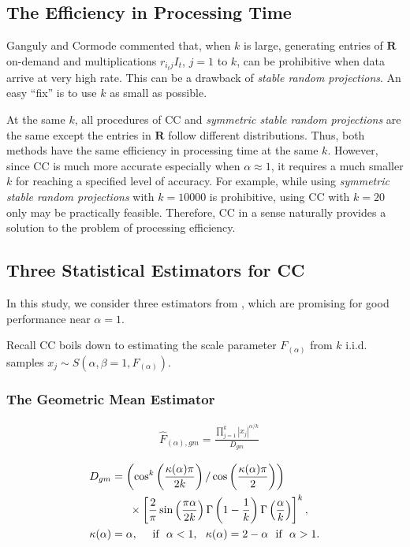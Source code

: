 \documentclass{sig-alternate}
\begin{document}
\subsection{The Efficiency in Processing Time}

Ganguly and Cormode \cite{Proc:Ganguly_RANDOM07} commented that, when $k$ is large, generating entries of $\mathbf{R}$ on-demand and multiplications $r_{i_tj} I_t$, $j = 1$ to $k$, can be prohibitive when  data arrive at very high rate.  This can be a drawback of {\em stable random projections}. An easy ``fix'' is to use $k$ as small as possible.

At the same $k$, all procedures of CC and {\em symmetric stable random projections} are the same except the entries in $\mathbf{R}$ follow different distributions. Thus, both methods have the same efficiency in processing time at the same $k$. However, since CC is much more accurate especially when $\alpha\approx 1$, it requires a much smaller  $k$ for reaching a specified level of accuracy. For example, while using {\em symmetric stable random projections} with $k = 10000$ is prohibitive, using CC with $k = 20$ only may be practically feasible.  Therefore, CC in a sense naturally provides a solution to the problem of processing efficiency. 

\subsection{Three Statistical Estimators for CC}

In this study, we consider three estimators from \cite{Article:Li_CC_v0,Article:Li_CC,Report:Li_CC_oq}, which are promising for good performance near $\alpha=1$.


Recall CC boils down to estimating the scale parameter $F_{(\alpha)}$ from $k$ i.i.d. samples $x_j \sim S\left(\alpha,\beta=1, F_{(\alpha)}\right)$.

\subsubsection{The Geometric Mean Estimator}
\vspace{-0.1in}
\begin{align}\label{eqn_F_gm}
&\hat{F}_{(\alpha),gm} = \frac{\prod_{j=1}^k |x_j|^{\alpha/k}} {D_{gm}}
\end{align}

\begin{align}\notag
&D_{gm} =  \left(\cos^k\left(\frac{\kappa(\alpha)\pi}{2k}\right)/\cos \left(\frac{\kappa(\alpha)\pi}{2}\right)\right)\\\notag
&\hspace{0.5in}\times  \left[\frac{2}{\pi}\sin\left(\frac{\pi\alpha}{2k}\right)
\Gamma\left(1-\frac{1}{k}\right)\Gamma\left(\frac{\alpha}{k}\right)\right]^k, \\\notag
&\kappa(\alpha) = \alpha, \ \ \  \  \text{if} \  \ \alpha<1, \   \ \kappa(\alpha) = 2-\alpha \  \ \text{if} \  \ \alpha>1.
\end{align}
\end{document}
